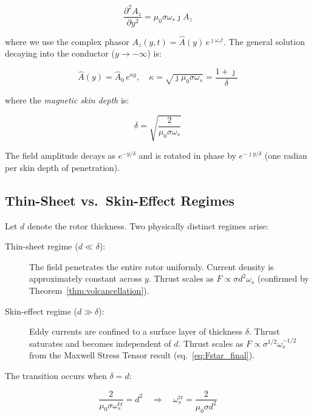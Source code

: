 \documentclass[12pt, a4paper]{article}
\theoremstyle{plain}
\theoremstyle{definition}
\newcommand{\oms}{\omega_s}
\newcommand{\sig}{\sigma}
\newcommand{\muZ}{\mu_0}
\newcommand{\DDer}[2]{\frac{\partial^2 #1}{\partial #2^2}}
\begin{document}
\begin{equation}
  \DDer{A_z}{y} = \muZ\sig\oms \jmath A_z
\end{equation}

where we use the complex phasor $A_z(y,t) = \hat{A}(y)\,e^{\jmath\oms t}$. The general
solution decaying into the conductor ($y \to -\infty$) is:

\begin{equation}
  \hat{A}(y) = \hat{A}_0 \, e^{\kappa y}, \quad
  \kappa = \sqrt{\jmath\muZ\sig\oms} = \frac{1+\jmath}{\delta}
\end{equation}

where the \emph{magnetic skin depth} is:

\begin{tcolorbox}[colback=yellow!10, colframe=orange!60]
\begin{equation}
  \boxed{\delta = \sqrt{\frac{2}{\muZ\sig\oms}}}
  \label{eq:skindepth}
\end{equation}
\end{tcolorbox}

The field amplitude decays as $e^{-y/\delta}$ and is rotated in phase by $e^{-\jmath y/\delta}$
(one radian per skin depth of penetration).

\subsection{Thin-Sheet vs.\ Skin-Effect Regimes}

Let $d$ denote the rotor thickness. Two physically distinct regimes arise:

\begin{description}
  \item[Thin-sheet regime ($d \ll \delta$):] The field penetrates the entire rotor
        uniformly. Current density is approximately constant across $y$. Thrust scales
        as $F \propto \sig d^2 \oms$ (confirmed by Theorem~\ref{thm:volcancellation}).

  \item[Skin-effect regime ($d \gg \delta$):] Eddy currents are confined to a surface
        layer of thickness $\delta$. Thrust saturates and becomes independent of $d$.
        Thrust scales as $F \propto \sig^{1/2} \oms^{-1/2}$ from the Maxwell Stress
        Tensor result (eq.~\eqref{eq:Fstar_final}).
\end{description}

The transition occurs when $\delta = d$:

\begin{equation}
  \frac{2}{\muZ\sig\oms^{\mathrm{tr}}} = d^2
  \quad \Longrightarrow \quad
  \oms^{\mathrm{tr}} = \frac{2}{\muZ\sig d^2}
  \label{eq:omtr}
\end{equation}
\end{document}
